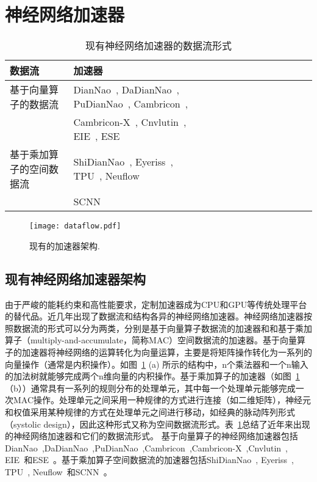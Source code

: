 \section{神经网络加速器}
\begin{table}[b]
  \footnotesize
  \centering
\caption{\footnotesize 现有神经网络加速器的数据流形式}
\label{tab:dataflow}
\begin{tabular}{@{}lllll@{}llllllll}
  \toprule
  数据流 & 加速器\\
  \midrule
  基于向量算子的数据流 & DianNao~\cite{chen2014diannao}, DaDianNao~\cite{chen2014dadiannao}, PuDianNao~\cite{liu2015pudiannao}, Cambricon~\cite{liu2016cambricon}, \\ 
  ~ & Cambricon-X~\cite{zhang2016cambricon}, Cnvlutin~\cite{albericio2016cnvlutin}, EIE~\cite{han2016eie}, ESE~\cite{han2017ese} \\
  基于乘加算子的空间数据流 & ShiDianNao~\cite{du2015shidiannao}, Eyeriss~\cite{chen2017eyeriss}, TPU~\cite{jouppi2017tpu}, Neuflow~\cite{farabet2011neuflow} \\
  ~& SCNN~\cite{angshuman2017scnn}  \\
\bottomrule
\end{tabular}
\end{table}

\begin{figure}[t]
  \centering
  \texttt{[image: dataflow.pdf]}
  \caption{\footnotesize 现有的加速器架构.}
  \label{fig:dataflow}
\end{figure}

\subsection{现有神经网络加速器架构}
由于严峻的能耗约束和高性能要求，定制加速器成为CPU和GPU等传统处理平台的替代品。近几年出现了数据流和结构各异的神经网络加速器。神经网络加速器按照数据流的形式可以分为两类，分别是基于向量算子数据流的加速器和和基于乘加算子（multiply-and-accumulate，简称MAC）空间数据流的加速器。基于向量算子的加速器将神经网络的运算转化为向量运算，主要是将矩阵操作转化为一系列的向量操作（通常是内积操作）。如图~\ref{fig:dataflow} (a) 所示的结构中，n个乘法器和一个n输入的加法树就能够完成两个n维向量的内积操作。基于乘加算子的加速器（如图~\ref{fig:dataflow}（b））通常具有一系列的规则分布的处理单元，其中每一个处理单元能够完成一次MAC操作。处理单元之间采用一种规律的方式进行连接（如二维矩阵），神经元和权值采用某种规律的方式在处理单元之间进行移动，如经典的脉动阵列形式（systolic design），因此这种形式又称为空间数据流形式。表~\ref{tab:dataflow}总结了近年来出现的神经网络加速器和它们的数据流形式。
基于向量算子的神经网络加速器包括DianNao~\cite{chen2014diannao},DaDianNao~\cite{chen2014dadiannao},PuDianNao~\cite{liu2015pudiannao},Cambricon~\cite{liu2016cambricon},Cambricon-X~\cite{zhang2016cambricon},Cnvlutin~\cite{albericio2016cnvlutin}, EIE~\cite{han2016eie}和ESE~\cite{han2017ese}。基于乘加算子空间数据流的加速器包括ShiDianNao~\cite{du2015shidiannao}, Eyeriss~\cite{chen2017eyeriss}, TPU~\cite{jouppi2017tpu}, Neuflow~\cite{farabet2011neuflow}和SCNN~\cite{angshuman2017scnn}。


